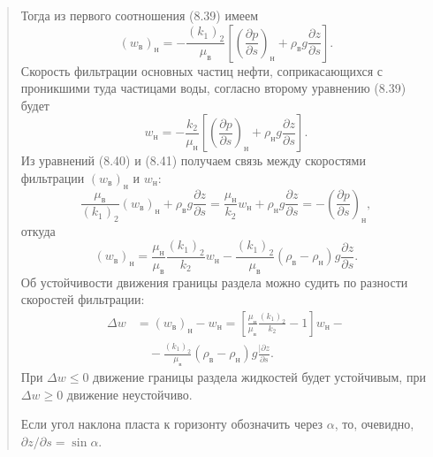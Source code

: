 \documentclass[12pt,a4paper]{article}
\begin{document}
\begin{quote}
Тогда из первого соотношения (8.39) имеем
\begin{equation}(w_\text{в})_\text{н}=-\frac{(k_1)_2}{\mu_\text{в}}\left[\left(\frac{\partial p}{\partial s}\right)_\text{н}+\rho_\text{в}g\frac{\partial z}{\partial s}\right].\tag{8.40}\label{q9:eq-8-40}\end{equation}
Скорость фильтрации основных частиц нефти, соприкасающихся с проникшими туда частицами воды, согласно второму уравнению (8.39) будет
\begin{equation}w_\text{н}=-\frac{k_2}{\mu_\text{н}}\left[\left(\frac{\partial p}{\partial s}\right)_\text{н}+\rho_\text{н}g\frac{\partial z}{\partial s}\right].\tag{8.41}\label{q9:eq-8-41}\end{equation}
Из уравнений (8.40) и (8.41) получаем связь между скоростями фильтрации $(w_\text{в})_\text{н}$ и $w_\text{н}$:
\[
\frac{\mu_\text{в}}{(k_1)_2}(w_\text{в})_\text{н}+\rho_\text{в}g\frac{\partial z}{\partial s}=\frac{\mu_\text{н}}{k_2}w_\text{н}+\rho_\text{н}g\frac{\partial z}{\partial s}=-\left(\frac{\partial p}{\partial s}\right)_\text{н},
\]
откуда
\[
(w_\text{в})_\text{н}=\frac{\mu_\text{н}}{\mu_\text{в}}\frac{(k_1)_2}{k_2}w_\text{н}-\frac{(k_1)_2}{\mu_\text{в}}(\rho_\text{в}-\rho_\text{н})g\frac{\partial z}{\partial s}.
\]
Об устойчивости движения границы раздела можно судить по разности скоростей фильтрации:
\begin{equation}\begin{aligned}
\Delta w&=(w_\text{в})_\text{н}-w_\text{н}=\left[\frac{\mu_\text{н}}{\mu_\text{в}}\frac{(k_1)_2}{k_2}-1\right]w_\text{н}-\\
&\quad-\frac{(k_1)_2}{\mu_\text{в}}(\rho_\text{в}-\rho_\text{н})g\frac{\vert\partial z}{\partial s}.
\end{aligned}\tag{8.42}\label{q9:eq-8-42}\end{equation}
При $\Delta w\le0$ движение границы раздела жидкостей будет устойчивым, при $\Delta w\ge0$ движение неустойчиво.

Если угол наклона пласта к горизонту обозначить через $\alpha$, то, очевидно, $\partial z/\partial s=\sin\alpha$.


\end{quote}
\end{document}
